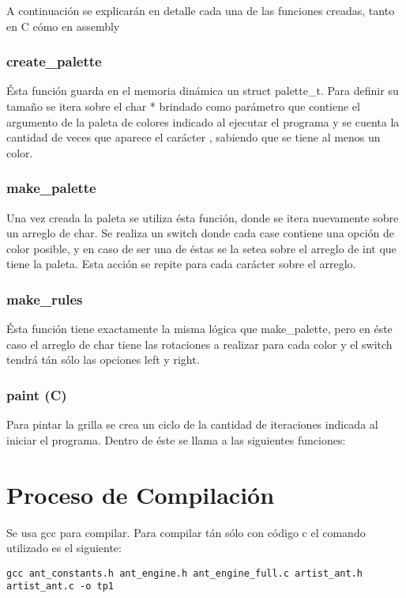\documentclass[a4paper, 10pt, twoside, notitlepage]{article}
\begin{document}
A continuación se explicarán en detalle cada una de las funciones creadas, tanto en C cómo en assembly

\subsubsection{create\_palette}
Ésta función guarda en el memoria dinámica un struct palette\_t. Para definir su tamaño se itera sobre el char * brindado como parámetro que contiene el argumento de la paleta de colores indicado al ejecutar el programa y se cuenta la cantidad de veces que aparece el carácter \textbar, sabiendo que se tiene al menos un color.

\subsubsection{make\_palette}
Una vez creada la paleta se utiliza ésta función, donde se itera nuevamente sobre un arreglo de char. Se realiza un switch donde cada case contiene una opción de color posible, y en caso de ser una de éstas se la setea sobre el arreglo de int que tiene la paleta. Esta acción se repite para cada carácter sobre el arreglo.

\subsubsection{make\_rules}
Ésta función tiene exactamente la misma lógica que make\_palette, pero en éste caso el arreglo de char tiene las rotaciones a realizar para cada color y el switch tendrá tán sólo las opciones left y right.

\subsubsection{paint (C)}
Para pintar la grilla se crea un ciclo de la cantidad de iteraciones indicada al iniciar el programa. Dentro de éste se llama a las siguientes funciones:


\section{Proceso de Compilación}

Se usa gcc para compilar. Para compilar tán sólo con código c el comando utilizado es el siguiente:

\begin{verbatim}
gcc ant_constants.h ant_engine.h ant_engine_full.c artist_ant.h artist_ant.c -o tp1    
\end{verbatim}
\end{document}
